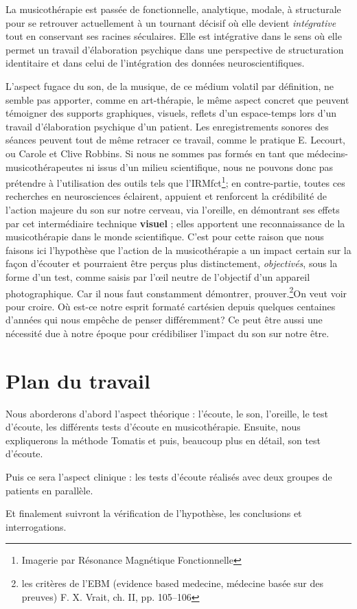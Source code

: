  La musicothérapie est passée de fonctionnelle, analytique, mo\-da\-le,  à 
struc\-tu\-rale pour se retrouver actuellement 
 à un tournant décisif où elle devient 
 \emph{intégrative} tout en conservant ses racines séculaires. Elle est 
intégrative dans le sens où elle permet un travail d'élaboration psychique dans 
une perspective de structuration identitaire \autocite[ch. III, p. 53, 
105]{vrait_musicotherapie_2018} et dans celui de l'intégration des données 
neuroscientifiques.
 
  
L'aspect fugace du son, de la musique, de ce médium volatil par
définition, ne semble pas apporter, comme en art-thérapie, le
même aspect concret que peuvent témoigner des supports graphiques,
visuels, reflets d'un espace-temps lors d'un travail d'élaboration
psychique d'un patient. Les enregistrements sonores des séances peuvent tout de 
même retracer ce travail, comme le pratique E. Lecourt, ou Carole et Clive 
Robbins.
Si nous ne sommes pas formés en tant que médecins-musicothérapeutes ni issus 
d'un milieu scientifique, nous ne pouvons donc  pas prétendre à l'utilisation 
des outils
 tels que l'IRMfct\footnote{Imagerie par Résonance Magnétique Fonctionnelle}; 
en contre-partie, toutes ces recherches en
neurosciences éclairent, appuient et renforcent la crédibilité de l'action
majeure du son sur notre cerveau, via l'oreille, en démontrant ses effets par 
cet intermédiaire technique \textbf{visuel} ; elles apportent une 
reconnaissance de la musicothérapie dans le monde scientifique. C'est pour 
cette raison que nous  faisons ici l'hypothèse que l'action de la 
musicothérapie a un impact certain sur la façon d'écouter et pourraient être 
perçus plus
distinctement, \textsl{objectivés}, sous la forme d'un test, comme saisis par 
l'\oe il neutre de l'objectif d'un appareil
photographique.
Car il nous faut constamment démontrer, prouver.\footnote{
	les critères de l'EBM (evidence based medecine, médecine basée sur des 
preuves) F. X. Vrait, ch. II, pp. 105--106 }On veut voir pour croire. Où est-ce 
notre esprit formaté cartésien depuis quelques centaines d'années qui nous 
empêche de penser différemment? 
Ce peut être aussi une nécessité due à notre époque pour crédibiliser l'impact 
du son sur notre être. 


\section{Plan du travail}

Nous aborderons d'abord l'aspect théorique : l'écoute, le son, l'oreille, le 
test d'écoute, les différents tests d'écoute en musicothérapie.  Ensuite, nous 
expliquerons  la méthode Tomatis
et puis, beaucoup plus en détail, son test d'écoute.

Puis ce sera l'aspect clinique : les tests d'écoute réalisés  avec deux groupes 
de patients en parallèle.

Et finalement suivront la vérification de l'hypothèse, les conclusions et 
interrogations. 
